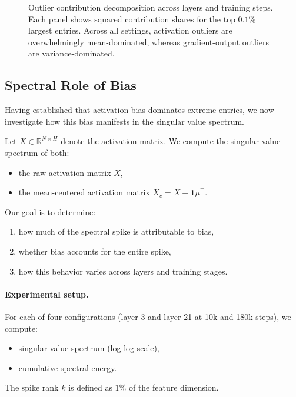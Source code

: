 \begin{figure}[t]
\caption{
Outlier contribution decomposition across layers and training steps.
Each panel shows squared contribution shares for the top $0.1\%$ largest entries.
Across all settings, activation outliers are overwhelmingly mean-dominated,
whereas gradient-output outliers are variance-dominated.
}
\label{fig:outlier_contrib_grid}

\end{figure}


\subsection{Spectral Role of Bias}
\label{subsec:spectral_role_bias}

Having established that activation bias dominates extreme entries, we now
investigate how this bias manifests in the singular value spectrum.

Let $X \in \mathbb{R}^{N \times H}$ denote the activation matrix.
We compute the singular value spectrum of both:

\begin{itemize}
\item the raw activation matrix $X$,
\item the mean-centered activation matrix $X_c = X - \mathbf{1}\mu^\top$.
\end{itemize}

Our goal is to determine:
\begin{enumerate}
\item how much of the spectral spike is attributable to bias,
\item whether bias accounts for the entire spike,
\item how this behavior varies across layers and training stages.
\end{enumerate}

\paragraph{Experimental setup.}
For each of four configurations
(layer 3 and layer 21 at 10k and 180k steps),
we compute:

\begin{itemize}
\item singular value spectrum (log-log scale),
\item cumulative spectral energy.
\end{itemize}

The spike rank $k$ is defined as $1\%$ of the feature dimension.

